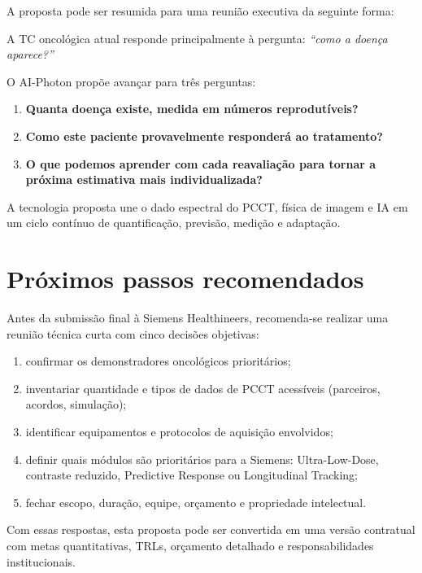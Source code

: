 \documentclass[11pt,a4paper]{article}
\begin{document}
A proposta pode ser resumida para uma reunião executiva da seguinte forma:

\begin{caixa}
A TC oncológica atual responde principalmente à pergunta: \emph{``como a doença aparece?''}

O AI-Photon propõe avançar para três perguntas:
\begin{enumerate}
\item \textbf{Quanta doença existe, medida em números reprodutíveis?}
\item \textbf{Como este paciente provavelmente responderá ao tratamento?}
\item \textbf{O que podemos aprender com cada reavaliação para tornar a próxima estimativa mais individualizada?}
\end{enumerate}

A tecnologia proposta une o dado espectral do PCCT, física de imagem e IA em um ciclo contínuo de quantificação, previsão, medição e adaptação.
\end{caixa}

\section{Próximos passos recomendados}

Antes da submissão final à Siemens Healthineers, recomenda-se realizar uma reunião técnica curta com cinco decisões objetivas:

\begin{enumerate}
\item confirmar os demonstradores oncológicos prioritários;
\item inventariar quantidade e tipos de dados de PCCT acessíveis (parceiros, acordos, simulação);
\item identificar equipamentos e protocolos de aquisição envolvidos;
\item definir quais módulos são prioritários para a Siemens: Ultra-Low-Dose, contraste reduzido, Predictive Response ou Longitudinal Tracking;
\item fechar escopo, duração, equipe, orçamento e propriedade intelectual.
\end{enumerate}

Com essas respostas, esta proposta pode ser convertida em uma versão contratual com metas quantitativas, TRLs, orçamento detalhado e responsabilidades institucionais.
\end{document}
